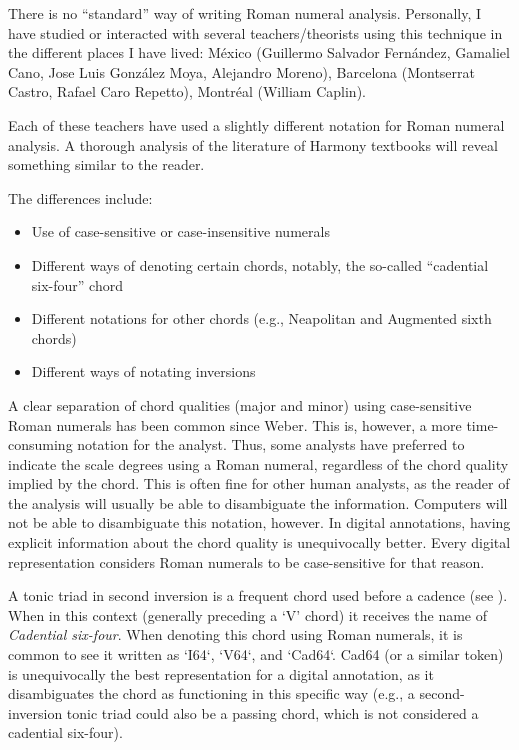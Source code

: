 There is no ``standard'' way of writing Roman numeral
analysis. Personally, I have studied or interacted with
several teachers/theorists using this technique in the
different places I have lived: M\'exico (Guillermo Salvador
Fern\'andez, Gamaliel Cano, Jose Luis Gonz\'alez Moya,
Alejandro Moreno), Barcelona (Montserrat Castro, Rafael Caro
Repetto), Montr\'eal (William Caplin).

Each of these teachers have used a slightly different
notation for Roman numeral analysis. A thorough analysis of
the literature of Harmony textbooks will reveal something
similar to the reader.

The differences include:
\begin{itemize}
    \item Use of case-sensitive or case-insensitive numerals
    \item Different ways of denoting certain chords,
    notably, the so-called ``cadential six-four'' chord
    \item Different notations for other chords (e.g.,
    Neapolitan and Augmented sixth chords)
    \item Different ways of notating inversions
\end{itemize}

A clear separation of chord qualities (major and minor)
using case-sensitive Roman numerals has been common since
Weber. This is, however, a more time-consuming notation for
the analyst. Thus, some analysts have preferred to indicate
the scale degrees using a Roman numeral, regardless of the
chord quality implied by the chord. This is often fine for
other human analysts, as the reader of the analysis will
usually be able to disambiguate the information. Computers
will not be able to disambiguate this notation, however. In
digital annotations, having explicit information about the
chord quality is unequivocally better. Every digital
representation considers Roman numerals to be case-sensitive
for that reason.

A tonic triad in second inversion is a frequent chord used
before a cadence (see ). When in this
context (generally preceding a `V' chord) it receives the
name of \emph{Cadential six-four}. When denoting this chord
using Roman numerals, it is common to see it written as
`I64`, `V64`, and `Cad64`. Cad64 (or a similar token) is
unequivocally the best representation for a digital
annotation, as it disambiguates the chord as functioning in
this specific way (e.g., a second-inversion tonic triad
could also be a passing chord, which is not considered a
cadential six-four).

